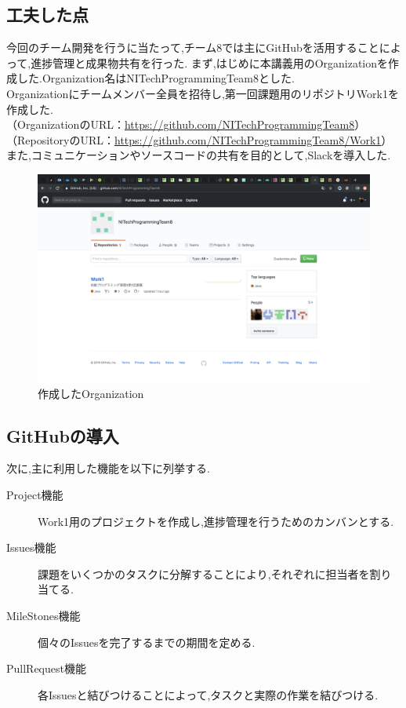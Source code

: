 \documentclass[uplatex,12pt]{jsarticle}
\begin{document}
\subsection{工夫した点}
今回のチーム開発を行うに当たって,チーム8では主にGitHubを活用することによって,進捗管理と成果物共有を行った.
まず,はじめに本講義用のOrganizationを作成した.Organization名はNITechProgrammingTeam8とした. \\
Organizationにチームメンバー全員を招待し,第一回課題用のリポジトリWork1を作成した. \\
（OrganizationのURL：\url{https://github.com/NITechProgrammingTeam8}）\\
（RepositoryのURL：\url{https://github.com/NITechProgrammingTeam8/Work1}）\\
また,コミュニケーションやソースコードの共有を目的として,Slackを導入した. \\

\begin{figure}[!hbt]
  \centering
  \includegraphics[scale=0.20]{git_image/organization_image.png}
  \caption{作成したOrganization}
\end{figure}

\newpage

\subsection{GitHubの導入}

次に,主に利用した機能を以下に列挙する. \\
\begin{description}
  \item[Project機能] Work1用のプロジェクトを作成し,進捗管理を行うためのカンバンとする.
  \item[Issues機能] 課題をいくつかのタスクに分解することにより,それぞれに担当者を割り当てる.
  \item[MileStones機能] 個々のIssuesを完了するまでの期間を定める.
  \item[PullRequest機能] 各Issuesと結びつけることによって,タスクと実際の作業を結びつける.
\end{description}
\end{document}
